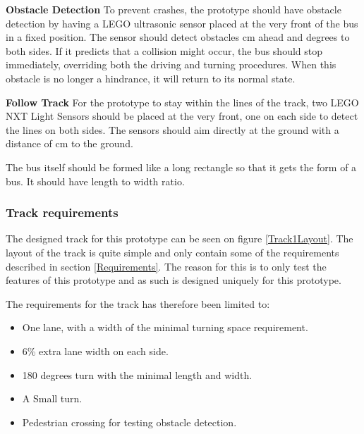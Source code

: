 \textbf{Obstacle Detection}\newline
To prevent crashes, the prototype should have obstacle detection by having a LEGO ultrasonic sensor placed at the very front of the bus in a fixed position. The sensor should detect obstacles  cm ahead and  degrees to both sides. If it predicts that a collision might occur, the bus should stop immediately, overriding both the driving and turning procedures. When this obstacle is no longer a hindrance, it will return to its normal state.  %

\textbf{Follow Track}\newline
For the prototype to stay within the lines of the track, two LEGO NXT Light Sensors should be placed at the very front, one on each side to detect the lines on both sides. The sensors should aim directly at the ground with a distance of  cm to the ground. 

The bus itself should be formed like a long rectangle so that it gets the form of a bus. It should have  length to width ratio.

\subsubsection{Track requirements}
The designed track for this prototype can be seen on figure \ref{Track1Layout}. The layout of the track is quite simple and only contain some of the requirements described in section \ref{Requirements}. The reason for this is to only test the features of this prototype and as such is designed uniquely for this prototype.

The requirements for the track has therefore been limited to:
\cite{DriveingCurves}
\begin{itemize}
  \item One lane, with a width of the minimal turning space requirement.
  \item 6\% extra lane width on each side.
  \item 180 degrees turn with the minimal length and width.
  \item A Small turn.
  \item Pedestrian crossing for testing obstacle detection.
\end{itemize}

